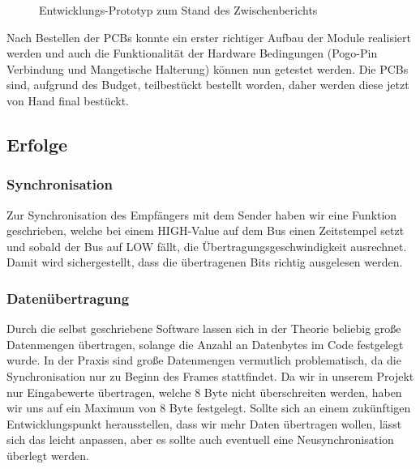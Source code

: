 \begin{figure}[H]
    \centering    
    \caption{Entwicklungs-Prototyp zum Stand des Zwischenberichts}
    \label{prototyp}
\end{figure}

Nach Bestellen der PCBs konnte ein erster richtiger Aufbau der Module realisiert werden und auch die Funktionalität der Hardware Bedingungen (Pogo-Pin Verbindung und Mangetische Halterung) können nun getestet werden. Die PCBs sind, aufgrund des Budget, teilbestückt bestellt worden, daher werden diese jetzt von Hand final bestückt.

\subsection{Erfolge}
\subsubsection{Synchronisation}
Zur Synchronisation des Empfängers mit dem Sender haben wir eine Funktion geschrieben, welche bei einem HIGH-Value auf dem Bus einen Zeitstempel setzt und sobald der Bus auf LOW fällt, die Übertragungsgeschwindigkeit ausrechnet. Damit wird sichergestellt, dass die übertragenen Bits richtig ausgelesen werden.

\subsubsection{Datenübertragung}
Durch die selbst geschriebene Software lassen sich in der Theorie beliebig große Datenmengen übertragen, solange die Anzahl an Datenbytes im Code festgelegt wurde. In der Praxis sind große Datenmengen vermutlich problematisch, da die Synchronisation nur zu Beginn des Frames stattfindet. Da wir in unserem Projekt nur Eingabewerte übertragen, welche 8 Byte nicht überschreiten werden, haben wir uns auf ein Maximum von 8 Byte festgelegt. Sollte sich an einem zukünftigen Entwicklungspunkt herausstellen, dass wir mehr Daten übertragen wollen, lässt sich das leicht anpassen, aber es sollte auch eventuell eine Neusynchronisation überlegt werden. 

